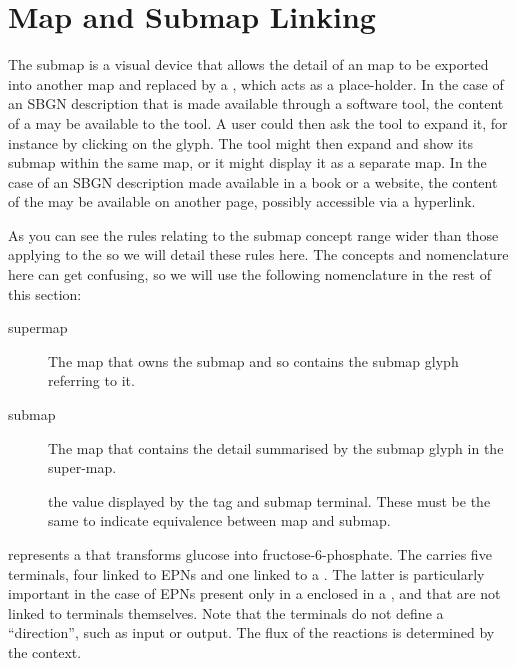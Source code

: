 \section{Map and Submap Linking}
\label{sec:mapsubmaps}
\label{sec:submaplinkingsemantics}

The submap is a visual device that allows the detail of an \PD map to
be exported into another \PD map and replaced by a
, which acts as a place-holder. In the case of an
SBGN description that is made available through a software tool, the
content of a  may be available to the tool.  A
user could then ask the tool to expand it, for instance by clicking on
the  glyph.  The tool might then expand and show
its submap within the same map, or it might display it as a separate
map. In the case of an SBGN description made available in a book or a
website, the content of the  may be available on another
page, possibly accessible via a hyperlink.

As you can see the rules relating to the submap concept range wider
than those applying to the  so we will detail
these rules here. The concepts and nomenclature here can get confusing, so we will use
 the following nomenclature in the rest of this section:
\begin{description}
\item[supermap] The map that owns the submap and so contains the submap glyph referring to it.
\item[submap] The map that contains the detail summarised by the submap glyph in the super-map.
\item[] the value displayed by the tag and
  submap terminal. These must be the same to indicate equivalence
  between map and submap.
\end{description}

 represents a  that transforms
glucose into fructose-6-phosphate. The  carries five
terminals, four linked to EPNs and one linked to a
.  The latter is particularly important in the case
of EPNs present only in a  enclosed in a
, and that are not linked to terminals themselves.  Note
that the terminals do not define a ``direction'', such as input or
output.  The flux of the reactions is determined by the context.


